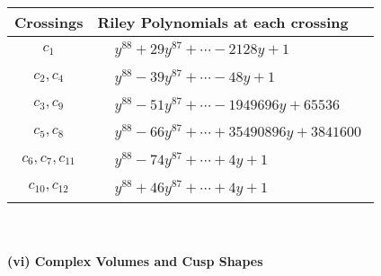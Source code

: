 \documentclass[1p]{elsarticle_modified}
\theoremstyle{definition}
\begin{document}
\begin{tabular}{m{50pt}|m{274pt}}
Crossings & \hspace{64pt}Riley Polynomials at each crossing \\
\hline $$\begin{aligned}c_{1}\end{aligned}$$&$\begin{aligned}
&y^{88}+29 y^{87}+\cdots-2128 y+1
\end{aligned}$\\
\hline $$\begin{aligned}c_{2},c_{4}\end{aligned}$$&$\begin{aligned}
&y^{88}-39 y^{87}+\cdots-48 y+1
\end{aligned}$\\
\hline $$\begin{aligned}c_{3},c_{9}\end{aligned}$$&$\begin{aligned}
&y^{88}-51 y^{87}+\cdots-1949696 y+65536
\end{aligned}$\\
\hline $$\begin{aligned}c_{5},c_{8}\end{aligned}$$&$\begin{aligned}
&y^{88}-66 y^{87}+\cdots+35490896 y+3841600
\end{aligned}$\\
\hline $$\begin{aligned}c_{6},c_{7},c_{11}\end{aligned}$$&$\begin{aligned}
&y^{88}-74 y^{87}+\cdots+4 y+1
\end{aligned}$\\
\hline $$\begin{aligned}c_{10},c_{12}\end{aligned}$$&$\begin{aligned}
&y^{88}+46 y^{87}+\cdots+4 y+1
\end{aligned}$\\
\hline
\end{tabular}\\~\\
\newpage\flushleft \textbf{(vi) Complex Volumes and Cusp Shapes}
\end{document}

